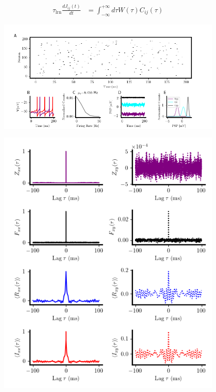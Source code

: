 \documentclass{ucetd}
\begin{document}
\begin{align}
\tau_{\mathrm{lrn}}\frac{d J_{ij}(t)}{dt} &=  \int_{-\infty}^{+\infty} d\tau W(\tau)C_{ij}(\tau)
\end{align}

\begin{figure}
\centering
\includegraphics[width=225mm]{figure-3}
\caption{}
\end{figure}

\begin{figure}[t!]
\centering
\includegraphics[width=140mm]{figure-4}
\caption{}
\end{figure}
\end{document}
